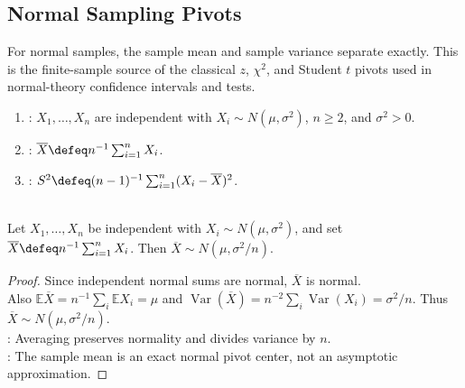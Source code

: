 \subsection{Normal Sampling Pivots}

For normal samples, the sample mean and sample variance separate exactly.  This
is the finite-sample source of the classical $z$, $\chi^2$, and Student $t$
pivots used in normal-theory confidence intervals and tests.

\begin{definition} \label{def:normal-sample-mean-variance} 
\begin{enumerate}[label=(\roman*)]
\setlength{\itemsep}{0pt}
\item {}: $X_1,\ldots,X_n$ are independent with $X_i\sim N(\mu,\sigma^2)$, $n\geq2$, and $\sigma^2>0$.
\item {}: $\overline{X}\defeq n^{-1}\sum_{i=1}^nX_i$.
\item {}: $S^2\defeq(n-1)^{-1}\sum_{i=1}^n(X_i-\overline{X})^2$.
\end{enumerate}
\end{definition}

\begin{proposition} \label{prop:normal-sample-mean-law} \\
Let $X_1,\ldots,X_n$ be independent with $X_i\sim N(\mu,\sigma^2)$, and set $\overline{X}\defeq n^{-1}\sum_{i=1}^nX_i$. Then $\overline{X}\sim N(\mu,\sigma^2/n)$.
\begin{proof} Since independent normal sums are normal, $\overline{X}$ is normal.\\
Also $\mathbb{E}\overline{X}=n^{-1}\sum_i\mathbb{E}X_i=\mu$ and $\operatorname{Var}(\overline{X})=n^{-2}\sum_i\operatorname{Var}(X_i)=\sigma^2/n$. Thus $\overline{X}\sim N(\mu,\sigma^2/n)$.\\
: Averaging preserves normality and divides variance by $n$.\\
: The sample mean is an exact normal pivot center, not an asymptotic approximation.
\end{proof}
\end{proposition}

